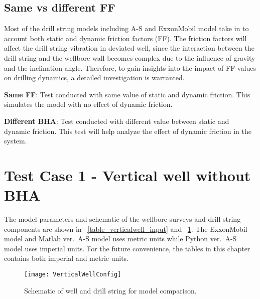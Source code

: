 \subsection{Same vs different FF}

Most of the drill string models including A-S and ExxonMobil model take in to account both static and dynamic friction factors (FF). The friction factors will affect the drill string vibration in deviated well, since the interaction between the drill string and the wellbore wall becomes complex due to the influence of gravity and the inclination angle.
Therefore, to gain insights into the impact of FF values on drilling dynamics, a detailed investigation is warranted.

\textbf{Same FF}: Test conducted with same value of static and dynamic friction. This simulates the model with no effect of dynamic friction. 

\textbf{Different BHA}: Test conducted with different value between static and dynamic friction. This test will help analyze the effect of dynamic friction in the system.

\section{Test Case 1 - Vertical well without BHA}
The model parameters and schematic of the wellbore surveys and drill string components are shown in  \tablename~\ref{table_verticalwell_input} and \figurename~\ref{figure_verticalwell}. The ExxonMobil model and Matlab ver.\ A-S model uses metric units while Python ver.\ A-S model uses imperial units. For the future convenience, the tables in this chapter contains both imperial and metric units.

\begin{figure}[!hbt]
  \centering
  \texttt{[image: VerticalWellConfig]}
  \caption[Schematic of well and drill string for model comparison.]{Schematic of well and drill string for model comparison.}\label{figure_verticalwell}
\end{figure}

